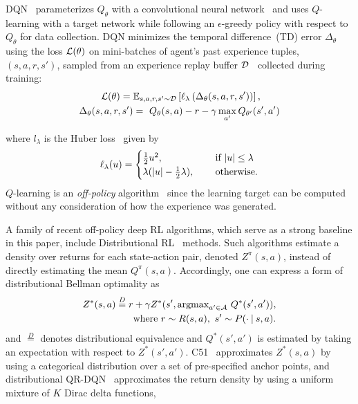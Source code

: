 DQN~\citep{mnih2013playing, mnih2015human} parameterizes $Q_\theta$ with a
convolutional neural network~\citep{lenet} and uses $Q$-learning with a target network
while following an $\epsilon$-greedy policy with respect to $Q_\theta$ for data
collection. DQN minimizes the temporal difference~(TD) error $\Delta_\theta$ using the loss $\mathcal{L}(\theta)$ on
mini-batches of agent's past experience tuples, $(s, a, r, s')$,
sampled from an experience replay buffer $\mathcal{D}$~\citep{lin1992self}
collected during training:
\begin{align}\label{eq:dqn_loss}
\mathcal{L}(\theta) ={}& \mathbb{E}_{s, a, r, s' \sim \mathcal{D}} \left[ \ell_{\lambda} \left( \Delta_\theta(s, a, r, s') \right)\right],\\
\Delta_\theta(s, a, r, s') &=~Q_{\theta}(s, a) - r - \gamma\max_{a'} Q_{\theta^{\prime}}(s', a') \nonumber
\end{align}

where $l_{\lambda }$ is the Huber loss~\citep{huber1964robust} given by
\begin{align}
    \ell_{\lambda}(u) = \begin{cases}
        \frac{1}{2} u^2,\quad \ &\text{if } |u| \le \lambda\\
        \lambda(|u| - \frac{1}{2}\lambda),\quad \ &\text{otherwise.}
    \end{cases}
\end{align}
$Q$-learning is an \textit{off-policy}
algorithm~\citep{sutton2018reinforcement} since the learning target
can be computed without any consideration of how the experience was
generated.

A family of recent off-policy deep RL algorithms, which serve as a strong
baseline in this paper, include Distributional
RL~\citep{bellemare2017distributional, jaquette1973markov} methods. Such
algorithms estimate a density over returns for each state-action
pair, denoted $Z^{\pi}(s, a)$, instead of directly estimating the mean
$Q^{\pi}(s, a)$.
Accordingly, one can express a form of distributional Bellman optimality %
as
\begin{align}
Z^{*}(s, a) \stackrel{D}{=} r +
\gamma Z^{*}(s', \mathrm{argmax}_{a' \in \mathcal{A}}~Q^*(s',a')), \label{eq:distributional_bellman}\\
\mathrm{where}~r \sim R(s, a),\ s' \sim P(\cdot \:\vert\: s, a). \nonumber
\end{align}
and
$\stackrel{D}{=}$ denotes distributional %
equivalence
and
$Q^*(s',a')$ is estimated by taking an expectation with respect to
$Z^{*}(s', a')$. C51~\citep{bellemare2017distributional} approximates
$Z^{*}(s, a)$ by using a categorical distribution over a set of pre-specified anchor points,
and distributional QR-DQN~\citep{dabney2018distributional}
approximates the return density by using a uniform mixture of $K$ Dirac delta functions, \ie

